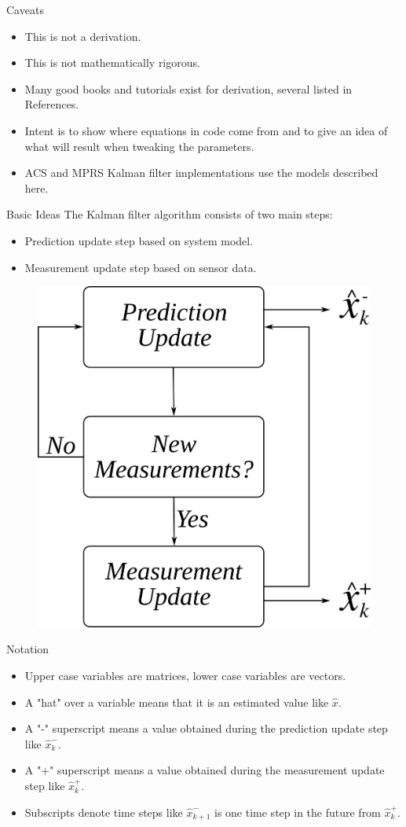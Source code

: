 \documentclass[hyperref={pdfpagelabels=false}]{beamer}
\begin{document}
\begin{frame}{Caveats}
\begin{itemize}
\item This is not a derivation.
\item This is not mathematically rigorous.
\item Many good books and tutorials exist for derivation, several listed in References.
\item Intent is to show where equations in code come from and to give an idea of what will result when tweaking the parameters.
\item ACS and MPRS Kalman filter implementations use the models described here.
\end{itemize}
\end{frame}

\begin{frame}{Basic Ideas}
The Kalman filter algorithm consists of two main steps:
\begin{itemize}
\item Prediction update step based on system model.
\item Measurement update step based on sensor data.
\end{itemize}
\begin{figure}[ht!]
	\centering
	\includegraphics[width=.3\textwidth]{images/kf}
\end{figure}
\end{frame}

\begin{frame}{Notation}
\begin{itemize}
\item Upper case variables are matrices, lower case variables are vectors.
\item A "hat" over a variable means that it is an estimated value like $\hat{x}$.
\item A "-" superscript means a value obtained during the prediction update step like $\hat{x}_k^-$.
\item A "+" superscript means a value obtained during the measurement update step like $\hat{x}_k^+$.
\item Subscripts denote time steps like $\hat{x}_{k+1}^-$ is one time step in the future from $\hat{x}_k^+$.
\end{itemize}
\end{frame}
\end{document}
